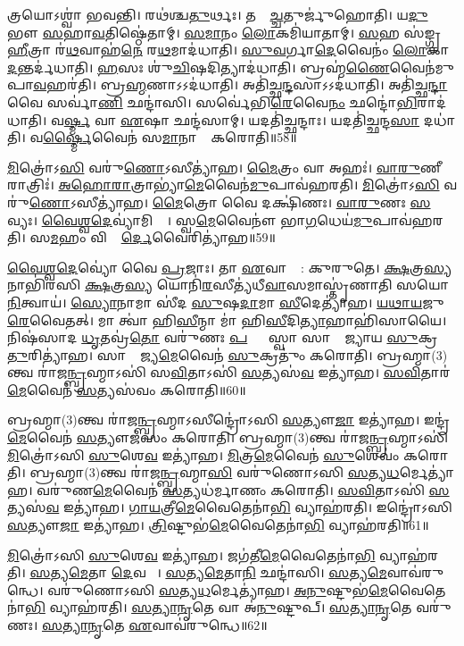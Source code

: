 𑌤𑍍𑌰𑌯𑍋\-𑌽𑌶𑍍𑌵𑌾॑ 𑌭𑌵𑌨𑍍𑌤𑌿।
𑌰𑌥॑𑌶𑍍𑌚\ul{𑌤𑍁}𑌰𑍍𑌥𑌃।
𑌤𑌸𑍍𑌮𑌾᳚\ul{𑌚𑍍𑌚}𑌤𑍁𑌰𑍍𑌜𑍁॑𑌹𑍋𑌤𑌿।
𑌯\ul{𑌦𑍁}𑌭𑍗 \ul{𑌸}𑌹𑌾\ul{𑌵}𑌤𑌿𑌷𑍍𑌠𑍇॑𑌤𑌾𑌮𑍍।
\ul{𑌸}\ul{𑌮𑌾}𑌨𑌂 \ul{𑌲𑍋}𑌕𑌮𑌿॑𑌯𑌾𑌤𑌾𑌮𑍍।
\ul{𑌸}𑌹 𑌸॑𑌙𑍍𑌗𑍍𑌰\ul{𑌹𑍀}𑌤𑍍𑌰𑌾 𑌰॑\ul{𑌥}𑌵𑌾𑌹॑\ul{𑌨𑍇} 𑌰\ul{𑌥}𑌮𑌾𑌦॑𑌧𑌾𑌤𑌿।
\ul{𑌸𑍁}\ul{𑌵}𑌰𑍍𑌗𑌾\ul{𑌦𑍇}𑌵𑍈𑌨𑌂॑ \ul{𑌲𑍋}𑌕𑌾\ul{𑌦}𑌨𑍍𑌤𑌰𑍍𑌦॑𑌧𑌾𑌤𑌿।
\ul{𑌹}\ul{}𑌸𑌃 𑌶𑍁॑\ul{𑌚𑌿}𑌷𑌦𑌿𑌤𑍍𑌯𑌾𑌦॑𑌧𑌾𑌤𑌿।
𑌬𑍍𑌰𑌹𑍍𑌮॑\ul{𑌣𑍈}𑌵𑍈𑌨॑𑌮𑍁𑌪𑌾\ul{𑌵}𑌹𑌰॑𑌤𑌿।
𑌬𑍍𑌰\ul{𑌹𑍍𑌮}𑌣𑌾\-𑌽𑌽𑌦॑𑌧𑌾𑌤𑌿।
𑌅𑌤𑌿॑𑌚𑍍𑌛\ul{𑌨𑍍𑌦}𑌸𑌾\-𑌽𑌽𑌦॑𑌧𑌾𑌤𑌿।
𑌅𑌤𑌿॑𑌚𑍍𑌛\ul{𑌨𑍍𑌦𑌾} 𑌵𑍈 𑌸𑌰𑍍𑌵𑌾॑\ul{𑌣𑌿} 𑌛𑌨𑍍𑌦𑌾॑𑌸𑌿।
𑌸𑌰𑍍𑌵𑍇॑𑌭𑌿\ul{𑌰𑍇}𑌵𑍈\ul{𑌨𑌂} 𑌛𑌨𑍍𑌦𑍋॑\ul{𑌭𑌿}𑌰𑌾𑌦॑𑌧𑌾𑌤𑌿।
𑌵\ul{𑌰𑍍𑌷𑍍𑌮} 𑌵𑌾 \ul{𑌏}𑌷𑌾 𑌛𑌨𑍍𑌦॑𑌸𑌾𑌮𑍍।
𑌯𑌦𑌤𑌿॑𑌚𑍍𑌛𑌨𑍍𑌦𑌾𑌃।
𑌯𑌦𑌤𑌿॑𑌚𑍍𑌛𑌨𑍍𑌦\ul{𑌸𑌾} 𑌦𑌧𑌾॑𑌤𑌿।
𑌵\ul{𑌰𑍍𑌷𑍍𑌮𑍈}𑌵𑍈𑌨॑ 𑌸\ul{𑌮𑌾}𑌨𑌾𑌨𑌾𑌂᳚ 𑌕𑌰𑍋𑌤𑌿॥58॥\anuvakamend[\ul{𑌪}\ul{𑌦𑍍𑌯}\ul{𑌨𑍍𑌤𑍇} \ul{𑌦}\ul{𑌧𑌾}\ul{𑌤𑌿} \ul{𑌵𑍀}𑌰𑍍𑌯𑍇॑𑌣𑍇\ul{𑌤𑍍𑌯𑌾}𑌹𑌾𑌨𑌾᳚\ul{𑌤𑍍𑌯𑍈} 𑌪𑍍𑌰𑌤𑌿॑\-𑌷𑍍𑌠𑌿\ul{𑌤𑍍𑌯𑍈} 𑌬𑍍𑌰\ul{𑌹𑍍𑌮}𑌣𑌾\-𑌽𑌽𑌦॑𑌧𑌾𑌤𑌿 \ul{𑌸}𑌪𑍍𑌤 𑌚॑]

\ul{𑌮𑌿}𑌤𑍍𑌰𑍋॑𑌽\ul{𑌸𑌿} 𑌵𑌰𑍁॑\ul{𑌣𑍋}\-𑌽𑌸𑍀𑌤𑍍𑌯𑌾॑𑌹।
\ul{𑌮𑍈}𑌤𑍍𑌰𑌂 𑌵𑌾 𑌅𑌹𑌃॑।
\ul{𑌵𑌾}\ul{𑌰𑍁}𑌣𑍀 𑌰𑌾𑌤𑍍𑌰𑌿𑌃॑।
\ul{𑌅}\ul{𑌹𑍋}\ul{𑌰𑌾}𑌤𑍍𑌰𑌾𑌭𑍍𑌯𑌾॑\ul{𑌮𑍇}𑌵𑍈𑌨॑\ul{𑌮𑍁}𑌪𑌾𑌵॑𑌹𑌰𑌤𑌿।
\ul{𑌮𑌿}𑌤𑍍𑌰𑍋॑𑌽\ul{𑌸𑌿} 𑌵𑌰𑍁॑\ul{𑌣𑍋}\-𑌽𑌸𑍀𑌤𑍍𑌯𑌾॑𑌹।
\ul{𑌮𑍈}𑌤𑍍𑌰𑍋 𑌵𑍈 𑌦𑌕𑍍𑌷𑌿॑𑌣𑌃।
\ul{𑌵𑌾}\ul{𑌰𑍁}𑌣𑌃 \ul{𑌸}𑌵𑍍𑌯𑌃।
\ul{𑌵𑍈}\ul{𑌶𑍍𑌵}\ul{𑌦𑍇}𑌵𑍍𑌯𑌾॑𑌮𑌿𑌕𑍍𑌷𑌾᳚।
𑌸𑍍𑌵\ul{𑌮𑍇}𑌵𑍈𑌨𑍗॑ 𑌭𑌾\ul{𑌗}𑌧𑍇𑌯॑\ul{𑌮𑍁}𑌪𑌾𑌵॑𑌹𑌰𑌤𑌿।
𑌸\ul{𑌮}𑌹𑌂 𑌵𑌿𑌶𑍍𑌵𑍈᳚\ul{𑌰𑍍𑌦𑍇}𑌵𑍈𑌰𑌿𑌤𑍍𑌯𑌾॑𑌹॥59॥

\ul{𑌵𑍈}\ul{𑌶𑍍𑌵}\ul{𑌦𑍇}𑌵𑍍𑌯𑍋॑ 𑌵𑍈 \ul{𑌪𑍍𑌰}𑌜𑌾𑌃।
𑌤𑌾 \ul{𑌏}𑌵𑌾𑌦𑍍𑌯𑌾᳚: 𑌕𑍁𑌰𑍁𑌤𑍇।
\ul{𑌕𑍍𑌷}𑌤𑍍𑌰\ul{𑌸𑍍𑌯} 𑌨𑌾𑌭𑌿॑𑌰𑌸𑌿 \ul{𑌕𑍍𑌷}𑌤𑍍𑌰\ul{𑌸𑍍𑌯} 𑌯𑍋𑌨𑌿॑\ul{𑌰}𑌸𑍀𑌤𑍍𑌯॑𑌧𑍀\ul{𑌵𑌾}𑌸𑌮𑌾𑌸𑍍𑌤𑍃॑𑌣𑌾𑌤𑌿 𑌸𑌯𑍋\ul{𑌨𑌿}𑌤𑍍𑌵𑌾𑌯॑।
\ul{𑌸𑍍𑌯𑍋}𑌨𑌾𑌮𑌾 𑌸𑍀॑𑌦 \ul{𑌸𑍁}𑌷\ul{𑌦𑌾}𑌮𑌾 \ul{𑌸𑍀}𑌦𑍇𑌤𑍍𑌯𑌾॑𑌹।
\ul{𑌯}\ul{𑌥𑌾}\ul{𑌯}𑌜𑍁\ul{𑌰𑍇}𑌵𑍈𑌤𑌤𑍍।
𑌮𑌾 𑌤𑍍𑌵𑌾॑ 𑌹𑌿\ul{𑌸𑍀}𑌨𑍍𑌮𑌾 𑌮𑌾॑ 𑌹𑌿\ul{𑌸𑍀}𑌦𑌿\ul{𑌤𑍍𑌯𑌾}𑌹𑌾𑌹𑌿॑𑌸𑌾𑌯𑍈।
𑌨𑌿𑌷॑𑌸𑌾𑌦 \ul{𑌧𑍃}𑌤𑌵𑍍𑌰॑\ul{𑌤𑍋} 𑌵𑌰𑍁॑𑌣𑌃 \ul{𑌪}𑌸𑍍𑌤𑍍𑌯𑌾᳚𑌸𑍍𑌵𑌾 𑌸𑌾𑌮𑍍𑌰𑌾᳚𑌜𑍍𑌯𑌾𑌯 \ul{𑌸𑍁}𑌕𑍍𑌰\ul{𑌤𑍁}𑌰𑌿𑌤𑍍𑌯𑌾॑𑌹।
𑌸𑌾𑌮𑍍𑌰𑌾᳚𑌜𑍍𑌯\ul{𑌮𑍇}𑌵𑍈𑌨॑ \ul{𑌸𑍁}𑌕𑍍𑌰𑌤𑍁𑌂॑ 𑌕𑌰𑍋𑌤𑌿।
𑌬𑍍𑌰𑌹𑍍𑌮𑌾(3)𑌨𑍍𑌤𑍍𑌵 𑌰𑌾॑𑌜\ul{𑌨𑍍𑌬𑍍𑌰}𑌹𑍍𑌮𑌾𑌽𑌸𑌿॑ 𑌸\ul{𑌵𑌿}𑌤𑌾𑌽𑌸𑌿॑ \ul{𑌸}𑌤𑍍𑌯𑌸॑\ul{𑌵} 𑌇𑌤𑍍𑌯𑌾॑𑌹।
\ul{𑌸}\ul{𑌵𑌿}𑌤𑌾𑌰॑\ul{𑌮𑍇}𑌵𑍈𑌨॑ \ul{𑌸}𑌤𑍍𑌯𑌸॑𑌵𑌂 𑌕𑌰𑍋𑌤𑌿॥60॥

𑌬𑍍𑌰𑌹𑍍𑌮𑌾(3)𑌨𑍍𑌤𑍍𑌵 𑌰𑌾॑𑌜\ul{𑌨𑍍𑌬𑍍𑌰}𑌹𑍍𑌮𑌾\-𑌽𑌸𑍀𑌨𑍍𑌦𑍍𑌰𑍋॑𑌽𑌸𑌿 \ul{𑌸}𑌤𑍍𑌯𑍗\ul{𑌜𑌾} 𑌇𑌤𑍍𑌯𑌾॑𑌹।
𑌇𑌨𑍍𑌦𑍍𑌰॑\ul{𑌮𑍇}𑌵𑍈𑌨॑ \ul{𑌸}𑌤𑍍𑌯𑍗𑌜॑𑌸𑌂 𑌕𑌰𑍋𑌤𑌿।
𑌬𑍍𑌰𑌹𑍍𑌮𑌾(3)𑌨𑍍𑌤𑍍𑌵 𑌰𑌾॑𑌜\ul{𑌨𑍍𑌬𑍍𑌰}𑌹𑍍𑌮𑌾𑌽𑌸𑌿॑ \ul{𑌮𑌿}𑌤𑍍𑌰𑍋॑𑌽𑌸𑌿 \ul{𑌸𑍁}𑌶𑍇\ul{𑌵} 𑌇𑌤𑍍𑌯𑌾॑𑌹।
\ul{𑌮𑌿}𑌤𑍍𑌰\ul{𑌮𑍇}𑌵𑍈𑌨॑ \ul{𑌸𑍁}𑌶𑍇𑌵𑌂॑ 𑌕𑌰𑍋𑌤𑌿।
𑌬𑍍𑌰𑌹𑍍𑌮𑌾(3)𑌨𑍍𑌤𑍍𑌵 𑌰𑌾॑𑌜\ul{𑌨𑍍𑌬𑍍𑌰}𑌹𑍍𑌮𑌾\ul{𑌸𑌿} 𑌵𑌰𑍁॑𑌣𑍋𑌽𑌸𑌿 \ul{𑌸}𑌤𑍍𑌯\ul{𑌧}𑌰𑍍𑌮𑍇𑌤𑍍𑌯𑌾॑𑌹।
𑌵𑌰𑍁॑𑌣\ul{𑌮𑍇}𑌵𑍈𑌨॑ \ul{𑌸}𑌤𑍍𑌯𑌧॑𑌰𑍍𑌮𑌾𑌣𑌂 𑌕𑌰𑍋𑌤𑌿।
\ul{𑌸}\ul{𑌵𑌿}𑌤𑌾𑌽𑌸𑌿॑ \ul{𑌸}𑌤𑍍𑌯𑌸॑\ul{𑌵} 𑌇𑌤𑍍𑌯𑌾॑𑌹।
\ul{𑌗𑌾}\ul{𑌯}𑌤𑍍𑌰𑍀\ul{𑌮𑍇}𑌵𑍈𑌤𑍇𑌨𑌾॑\ul{𑌭𑌿} 𑌵𑍍𑌯𑌾𑌹॑𑌰𑌤𑌿।
𑌇𑌨𑍍𑌦𑍍𑌰𑍋॑𑌽𑌸𑌿 \ul{𑌸}𑌤𑍍𑌯𑍗\ul{𑌜𑌾} 𑌇𑌤𑍍𑌯𑌾॑𑌹।
\ul{𑌤𑍍𑌰𑌿}𑌷𑍍𑌟𑍁𑌭॑\ul{𑌮𑍇}𑌵𑍈𑌤𑍇𑌨𑌾॑\ul{𑌭𑌿} 𑌵𑍍𑌯𑌾𑌹॑𑌰𑌤𑌿॥61॥

\ul{𑌮𑌿}𑌤𑍍𑌰𑍋॑𑌽𑌸𑌿 \ul{𑌸𑍁}𑌶𑍇\ul{𑌵} 𑌇𑌤𑍍𑌯𑌾॑𑌹।
𑌜𑌗॑𑌤𑍀\ul{𑌮𑍇}𑌵𑍈𑌤𑍇𑌨𑌾॑\ul{𑌭𑌿} 𑌵𑍍𑌯𑌾𑌹॑𑌰𑌤𑌿।
\ul{𑌸}𑌤𑍍𑌯\ul{𑌮𑍇}𑌤𑌾 \ul{𑌦𑍇}𑌵𑌤𑌾𑌃᳚।
\ul{𑌸}𑌤𑍍𑌯\ul{𑌮𑍇}𑌤𑌾\ul{𑌨𑌿} 𑌛𑌨𑍍𑌦𑌾॑𑌸𑌿।
\ul{𑌸}𑌤𑍍𑌯\ul{𑌮𑍇}𑌵𑌾𑌵॑\-𑌰𑍁𑌨𑍍𑌧𑍇।
𑌵𑌰𑍁॑𑌣𑍋𑌽𑌸𑌿 \ul{𑌸}𑌤𑍍𑌯\ul{𑌧}𑌰𑍍𑌮𑍇𑌤𑍍𑌯𑌾॑𑌹।
\ul{𑌅}\ul{𑌨𑍁}𑌷𑍍𑌟𑍁𑌭॑\ul{𑌮𑍇}𑌵𑍈𑌤𑍇𑌨𑌾॑\ul{𑌭𑌿} 𑌵𑍍𑌯𑌾𑌹॑𑌰𑌤𑌿।
\ul{𑌸}\ul{𑌤𑍍𑌯𑌾}\ul{𑌨𑍃}𑌤𑍇 𑌵𑌾 𑌅॑\ul{𑌨𑍁}𑌷𑍍𑌟𑍁𑌪𑍍।
\ul{𑌸}\ul{𑌤𑍍𑌯𑌾}\ul{𑌨𑍃}𑌤𑍇 𑌵𑌰𑍁॑𑌣𑌃।
\ul{𑌸}\ul{𑌤𑍍𑌯𑌾}\ul{𑌨𑍃}𑌤𑍇 \ul{𑌏}𑌵𑌾𑌵॑𑌰𑍁𑌨𑍍𑌧𑍇॥62॥

